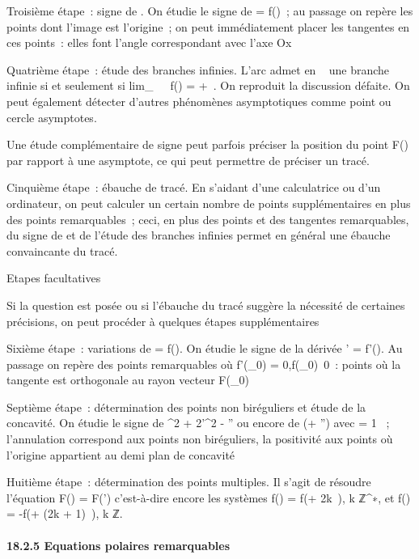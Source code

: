 \documentclass[]{article}
\begin{document}
Troisième étape~: signe de \rho. On étudie le signe de \rho = f(\theta)~; au
passage on repère les points dont l'image est l'origine~; on peut
immédiatement placer les tangentes en ces points~: elles font l'angle
correspondant avec l'axe Ox

Quatrième étape~: étude des branches infinies. L'arc admet en \alpha~
\in\overlineD une branche infinie si et seulement si
lim\_\theta\rightarrow~\alpha~~\textbar{}f(\theta)\textbar{} = +\infty~.
On reproduit la discussion dé faite. On peut également détecter
d'autres phénomènes asymptotiques comme point ou cercle asymptotes.

Une étude complémentaire de signe peut parfois préciser la position du
point F(\theta) par rapport à une asymptote, ce qui peut permettre de
préciser un tracé.

Cinquième étape~: ébauche de tracé. En s'aidant d'une calculatrice ou
d'un ordinateur, on peut calculer un certain nombre de points
supplémentaires en plus des points remarquables~; ceci, en plus des
points et des tangentes remarquables, du signe de \rho et de l'étude des
branches infinies permet en général une ébauche convaincante du tracé.

Etapes facultatives

Si la question est posée ou si l'ébauche du tracé suggère la nécessité
de certaines précisions, on peut procéder à quelques étapes
supplémentaires

Sixième étape~: variations de \rho = f(\theta). On étudie le signe de la dérivée
\rho' = f'(\theta). Au passage on repère des points remarquables où
f'(\theta\_0) = 0,f(\theta\_0)\neq~0~:
points où la tangente est orthogonale au rayon vecteur F(\theta\_0)

Septième étape~: détermination des points non biréguliers et étude de la
concavité. On étudie le signe de \rho^2 + 2\rho'^2 -
\rho\rho'' ou encore de \phi(\phi + \phi'') avec \phi = 1 \over \rho ~;
l'annulation correspond aux points non biréguliers, la positivité aux
points où l'origine appartient au demi plan de concavité

Huitième étape~: détermination des points multiples. Il s'agit de
résoudre l'équation F(\theta) = F(\theta') c'est-à-dire encore les systèmes f(\theta) =
f(\theta + 2k\pi~), k \in ℤ^∗, et f(\theta) = -f(\theta + (2k + 1)\pi~), k \in ℤ.

\paragraph{18.2.5 Equations polaires remarquables}
\end{document}
